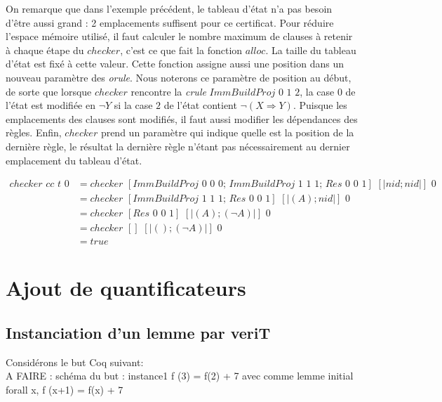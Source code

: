\documentclass[11pt]{article}
\begin{document}
On remarque que dans l'exemple précédent, le tableau d'état n'a pas besoin d'être aussi grand : 2 emplacements suffisent pour ce certificat. Pour réduire l'espace mémoire utilisé, il faut calculer le nombre maximum de clauses à retenir à chaque étape du $checker$, c'est ce que fait la fonction $alloc$. La taille du tableau d'état est fixé à cette valeur. Cette fonction assigne aussi une position dans un nouveau paramètre des \textit{orule}. Nous noterons ce paramètre de position au début, de sorte que lorsque $checker$ rencontre la \textit{crule} $ImmBuildProj \,\, 0\,\, 1 \,\, 2$, la case $0$ de l'état est modifiée en $\neg Y$ si la case $2$ de l'état contient $\neg(X \Rightarrow Y)$. Puisque les emplacements des clauses sont modifiés, il faut aussi modifier les dépendances des règles. Enfin, $checker$ prend un paramètre qui indique quelle est la position de la dernière règle, le résultat la dernière règle n'étant pas nécessairement au dernier emplacement du tableau d'état.  

\begin{align*}
    checker \,\, cc \,\, t \,\, 0 &= checker \,\, [ImmBuildProj \,\, 0\,\, 0 \,\, 0; \,ImmBuildProj \,\, 1\,\, 1 \,\, 1; \, Res \,\, 0 \,\, 0 \,\, 1] \,\, [| nid; nid|] \,\, 0 \\
    &= checker \,\, [ImmBuildProj \,\, 1 \,\, 1 \,\, 1; \, Res \,\, 0 \,\, 0 \,\, 1] \,\, [| (A); nid|] \,\, 0 \\
    &= checker \,\, [Res \,\, 0 \,\, 0 \,\, 1] \,\, [| (A); (\neg A)|] \,\, 0 \\
    &= checker \,\, [] \,\, [| (); (\neg A)|] \,\, 0 \\
    &= true
\end{align*}




\newpage
\section{Ajout de quantificateurs}


\subsection{Instanciation d'un lemme par veriT}

Considérons le but Coq suivant: \\

A FAIRE : schéma du but : instance1 f (3) = f(2) + 7 avec comme lemme initial forall x, f (x+1) = f(x) + 7 \\
\end{document}
